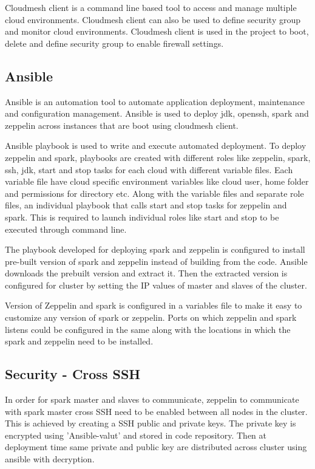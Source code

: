 \documentclass[9pt,twocolumn,twoside]{../../styles/osajnl}
\begin{document}
	Cloudmesh client is a command line based tool to access and manage
	multiple cloud environments. Cloudmesh client can also be used to
	define security group and monitor cloud environments. Cloudmesh 
	client
	is used in the project to boot, delete and define security group 
	to
	enable firewall settings.
	
	\subsection{Ansible}
	
	Ansible is an automation tool to automate application deployment,
	maintenance and configuration management. Ansible is used to 
	deploy
	jdk, openssh, spark and zeppelin across instances that are boot 
	using
	cloudmesh client.
	
	Ansible playbook is used to write and execute automated 
	deployment. To
	deploy zeppelin and spark, playbooks are created with different 
	roles
	like zeppelin, spark, ssh, jdk, start and stop tasks for each 
	cloud with different
	variable files. Each variable file have cloud specific environment
	variables like cloud user, home folder and permissions for 
	directory
	etc. Along with the variable files and separate role files, an 
	individual playbook that calls start and stop tasks for zeppelin 
	and spark. 
	This
	is required to launch individual roles like start and stop to be
	executed through command line. 
	
	The playbook developed for deploying spark and zeppelin is 
	configured to
	install pre-built version of spark and zeppelin instead of 
	building
	from the code. Ansible downloads the prebuilt version and extract
	it. Then the extracted version is configured for cluster by 
	setting
	the IP values of master and slaves of the cluster. 
	
	Version of Zeppelin and spark is configured in a variables file to
	make it easy to customize any version of spark or zeppelin. Ports 
	on
	which zeppelin and spark listens could be configured in the same
	along with the locations in which the spark and zeppelin need to 
	be installed. 
	
	\subsection{Security - Cross SSH}
	In order for spark master and slaves to communicate, zeppelin to
	communicate with spark master cross SSH need to be enabled 
	between all
	nodes in the cluster. This is achieved by creating a SSH public 
	and
	private keys. The private key is encrypted using 'Ansible-valut' 
	and
	stored in code repository. Then at deployment time same private 
	and
	public key are distributed across cluster using ansible with
	decryption. 
	
\end{document}

